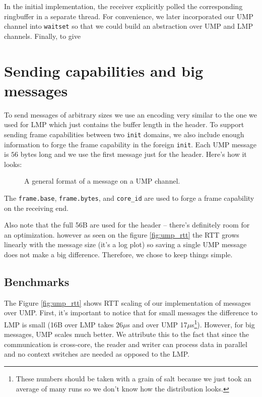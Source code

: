 In the initial implementation, the receiver explicitly polled the corresponding ringbuffer in a separate thread. For convenience, we later incorporated our UMP channel into \texttt{waitset} so that we could build an abstraction over UMP and LMP channels. Finally, to give 

\section{Sending capabilities and big messages}
To send messages of arbitrary sizes we use an encoding very similar to the one we used for LMP which just contains the buffer length in the header. To support sending frame capabilities between two  \texttt{init} domains, we also include enough information to forge the frame capability in the foreign \texttt{init}. Each UMP message is $56$ bytes long and we use the first message just for the header. Here's how it looks:

\begin{figure}[ht]
    \centering
        \scalebox{0.8}{
            
        }
    \caption{A general format of a message on a UMP channel.}
    \label{fig:ump_msg}
\end{figure}

The \texttt{frame.base}, \texttt{frame.bytes}, and \texttt{core_id} are used to forge a frame capability on the receiving end.

Also note that the full 56B are used for the header -- there's definitely room for an optimization. however as seen on the figure \ref{fig:ump_rtt} the RTT grows linearly with the message size (it's a log plot) so saving a single UMP message does not make a big difference. Therefore, we chose to keep things simple.

\subsection{Benchmarks}
\label{sec:ump_bench}

The Figure \ref{fig:ump_rtt} shows RTT scaling of our implementation of messages over UMP. First, it's important to notice that for small messages the difference to LMP is small (16B over LMP takes 26$\mu$s and over UMP 17$\mu$s\footnote{These numbers should be taken with a grain of salt because we just took an average of many runs so we don't know how the distribution looks.}). However, for big messages, UMP scales much better. We attribute this to the fact that since the communication is cross-core, the reader and writer can process data in parallel and no context switches are needed as opposed to the LMP.


